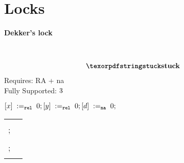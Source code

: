 
\section{Locks}
\label{app:locks}

\begin{minipage}[t]{0.4\linewidth}
\textbf{Dekker's lock}\\\\
\possibleOutcomes\\
\[\begin{array}{l}
  \Stuck
\end{array}\]
Requires: RA + na\\
Fully Supported: $\tick$\\
\end{minipage}
%
\codePrefix
$[x] \;:=_{{\mathtt{rel}}}\;0; [y] \;:=_{{\mathtt{rel}}}\;0; [d] \;:=_{\mathtt{na}}\;0;$ \\
\begin{tabular}{L || L}
  \begin{array}{@{}l@{}}
    ; \\
    ; \\
  \end{array} &
  \begin{array}{@{}l@{}}
    ; \\
    ; \\
  \end{array}
\end{tabular}
\codePostfix

